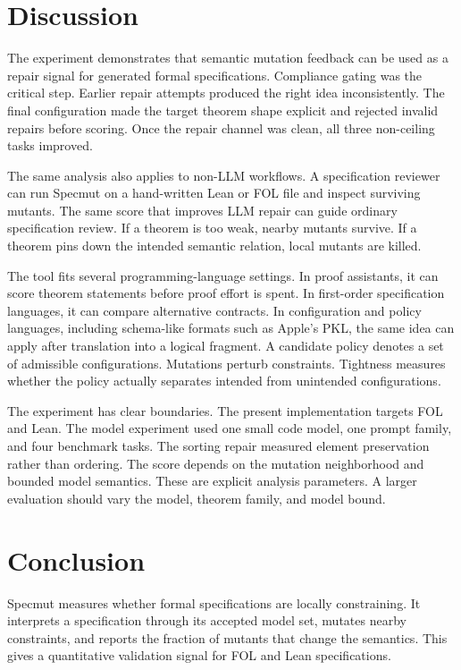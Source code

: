 \documentclass[11pt]{article}
\begin{document}
\section{Discussion}

The experiment demonstrates that semantic mutation feedback can be used as a repair signal for generated formal specifications. Compliance gating was the critical step. Earlier repair attempts produced the right idea inconsistently. The final configuration made the target theorem shape explicit and rejected invalid repairs before scoring. Once the repair channel was clean, all three non-ceiling tasks improved.

The same analysis also applies to non-LLM workflows. A specification reviewer can run Specmut on a hand-written Lean or FOL file and inspect surviving mutants. The same score that improves LLM repair can guide ordinary specification review. If a theorem is too weak, nearby mutants survive. If a theorem pins down the intended semantic relation, local mutants are killed.

The tool fits several programming-language settings. In proof assistants, it can score theorem statements before proof effort is spent. In first-order specification languages, it can compare alternative contracts. In configuration and policy languages, including schema-like formats such as Apple's PKL, the same idea can apply after translation into a logical fragment. A candidate policy denotes a set of admissible configurations. Mutations perturb constraints. Tightness measures whether the policy actually separates intended from unintended configurations.

The experiment has clear boundaries. The present implementation targets FOL and Lean. The model experiment used one small code model, one prompt family, and four benchmark tasks. The sorting repair measured element preservation rather than ordering. The score depends on the mutation neighborhood and bounded model semantics. These are explicit analysis parameters. A larger evaluation should vary the model, theorem family, and model bound.

\section{Conclusion}

Specmut measures whether formal specifications are locally constraining. It interprets a specification through its accepted model set, mutates nearby constraints, and reports the fraction of mutants that change the semantics. This gives a quantitative validation signal for FOL and Lean specifications.
\end{document}
